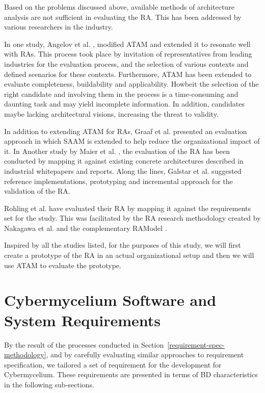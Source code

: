 \documentclass{bmcart}
\begin{document}
Based on the problems discussed above, available methods of architecture analysis are not sufficient in evaluating the RA. This has been addressed by various researchers in the industry.

In one study, Angelov et al. \cite{angelov2008towards}, modified ATAM and extended it to resonate well with RAs. This process took place by invitation of representatives from leading industries for the evaluation process, and the selection of various contexts and defined scenarios for these contexts. Furthermore, ATAM has been extended to evaluate completeness, buildability and applicability. Howbeit the selection of the right candidate and involving them in the process is a time-consuming and daunting task and may yield incomplete information. In addition, candidates maybe lacking architectural visions, increasing the threat to validity.

In addition to extending ATAM for RAs, Graaf et al. \cite{graaf2005evaluating} presented an evaluation approach in which SAAM is extended to help reduce the organizational impact of it. In Another study by Maier et al. \cite{Maier}, the evaluation of the RA has been conducted by mapping it against existing concrete architectures described in industrial whitepapers and reports. Along the lines, Galstar et al. \cite{galster2011empirically} suggested reference implementations, prototyping and incremental approach for the validation of the RA.

Rohling et al. \cite{rohling2019reference} have evaluated their RA by mapping it against the requirements set for the study. This was facilitated by the RA research methodology created by Nakagawa et al. \cite{Nakagawa} and the complementary RAModel \cite{nakagawa2012ramodel}.

Inspired by all the studies listed, for the purposes of this study, we will first create a prototype of the RA in an actual organizational setup and then we will use ATAM to evaluate the prototype.

\section{Cybermycelium Software and System Requirements} \label{requirements-section}

By the result of the processes conducted in Section~\ref{requirement-spec-methodology}, and by carefully evaluating similar approaches to requirement specification, we tailored a set of requirement for the development for Cybermycelium. These requirements are presented in terms of BD characteristics in the following sub-sections.
\end{document}
